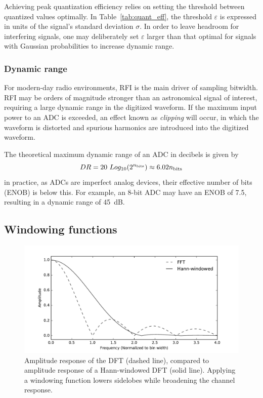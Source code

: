 \documentclass{ws-rv961x669}
\begin{document}
Achieving peak quantization efficiency relies on setting the threshold between quantized values optimally. In Table~\ref{tab:quant_eff}, the threshold $\varepsilon$ is expressed in units of the signal's standard deviation $\sigma$. In order to leave headroom for interfering signals, one may deliberately set $\varepsilon$ larger than that optimal for signals with Gaussian probabilities to increase dynamic range.


\subsubsection{Dynamic range\label{sub:dynamic-range}}

For modern-day radio environments, RFI is the main driver of sampling bitwidth. RFI may be orders of magnitude stronger than an astronomical signal of interest, requiring a large dynamic range in the digitized waveform. If the maximum input power to an ADC is exceeded, an effect known as \emph{clipping} will occur, in which the waveform is distorted and spurious harmonics are introduced into the digitized waveform.

The theoretical maximum dynamic range of an ADC in decibels is given by 
\begin{equation}
	DR = 20~Log_{10}(2^{n_{\rm{bits}}}) \approx 6.02 n_{\rm{bits}}
\end{equation}
in practice, as ADCs are imperfect analog devices, their effective number of bits (ENOB) is below this. For example, an 8-bit ADC may have an ENOB of 7.5, resulting in a dynamic range of 45~dB.



\subsection{Windowing functions}

\begin{figure}[t]
 \centering
 \includegraphics[width=\textwidth]{./figures/fft_resp}
 
 \caption{Amplitude response of the DFT (dashed line), compared to amplitude response of a Hann-windowed DFT (solid line). Applying a windowing function lowers sidelobes while broadening the channel response. \label{fig:fft_resp}}
\end{figure}
\end{document}

